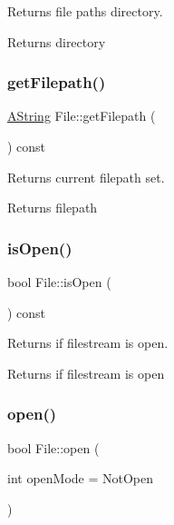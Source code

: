 Returns file path\textquotesingle{}s directory. 

\begin{DoxyReturn}{Returns}
directory 
\end{DoxyReturn}
\mbox{\label{class_file_a033178594e2a60e489d7ab2936676e90}} 
\subsubsection{\texorpdfstring{getFilepath()}{getFilepath()}}
{\footnotesize\ttfamily \mbox{\hyperlink{class_a_string}{A\+String}} File\+::get\+Filepath (\begin{DoxyParamCaption}{ }\end{DoxyParamCaption}) const}



Returns current filepath set. 

\begin{DoxyReturn}{Returns}
filepath 
\end{DoxyReturn}
\mbox{\label{class_file_abb0ce5b71ecf6fbaa538a812a622fc10}} 
\subsubsection{\texorpdfstring{isOpen()}{isOpen()}}
{\footnotesize\ttfamily bool File\+::is\+Open (\begin{DoxyParamCaption}{ }\end{DoxyParamCaption}) const}



Returns if filestream is open. 

\begin{DoxyReturn}{Returns}
if filestream is open 
\end{DoxyReturn}
\mbox{\label{class_file_a0e9dcaeac1036345bf15d941a6989caf}} 
\subsubsection{\texorpdfstring{open()}{open()}}
{\footnotesize\ttfamily bool File\+::open (\begin{DoxyParamCaption}\item[{int}]{open\+Mode = {\ttfamily NotOpen} }\end{DoxyParamCaption})}



